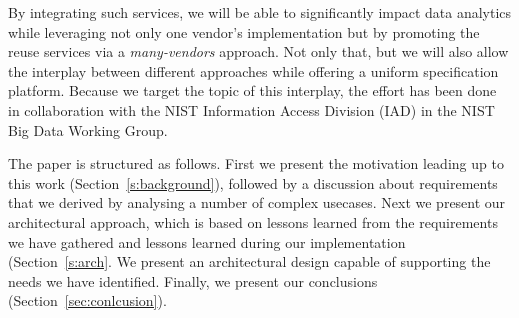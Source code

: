 By integrating such services, we will be able to significantly impact
data analytics while leveraging not only one vendor's implementation
but by promoting the reuse services via a {\em many-vendors}
approach. Not only that, but we will also allow the interplay between
different approaches while offering a uniform specification platform.
Because we target the topic of this interplay, the effort has been
done in collaboration with the NIST Information Access Division (IAD)
in the NIST Big Data Working Group.

The paper is structured as follows. First we present the motivation
leading up to this work (Section~\ref{s:background}), followed by a
discussion about requirements that we derived by analysing a number of
complex usecases. Next we present our architectural approach, which is
based on lessons learned from the requirements we have gathered and
lessons learned during our implementation (Section~\ref{s:arch}. We
present an architectural design capable of supporting the needs we
have identified.  Finally, we present our conclusions
(Section~\ref{sec:conlcusion}).
